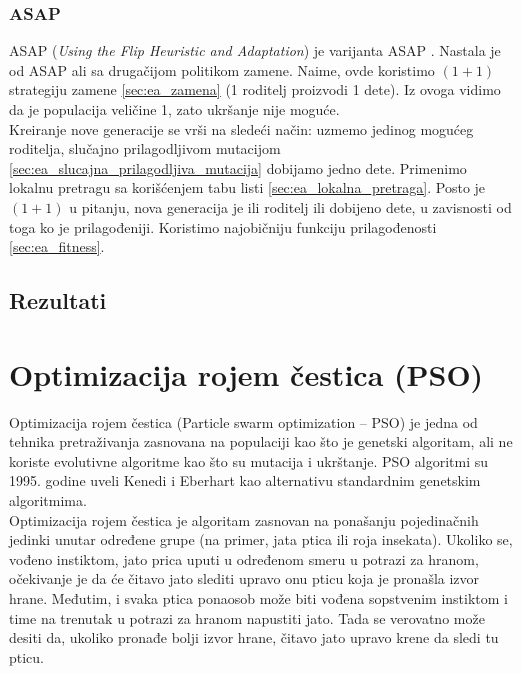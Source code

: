 \documentclass{article}
\begin{document}
\subsubsection{ASAP}
\label{sec:ea_asap}
ASAP (\textit{Using the Flip Heuristic and Adaptation}) je varijanta ASAP \cite{ea_with_table}. Nastala je od ASAP ali sa drugačijom politikom zamene. Naime, ovde koristimo
$(1+1)$ strategiju zamene \ref{sec:ea_zamena} (1 roditelj proizvodi 1 dete). Iz ovoga vidimo da je populacija veličine 1, zato ukršanje nije moguće. \\

Kreiranje nove generacije se vrši na sledeći način: uzmemo jedinog mogućeg roditelja, slučajno prilagodljivom mutacijom \ref{sec:ea_slucajna_prilagodljiva_mutacija} dobijamo jedno dete. Primenimo lokalnu pretragu sa korišćenjem tabu listi \ref{sec:ea_lokalna_pretraga}. Posto je $(1+1)$ u pitanju, nova generacija je ili roditelj ili dobijeno dete, u zavisnosti od toga ko je prilagođeniji. Koristimo najobičniju funkciju prilagođenosti \ref{sec:ea_fitness}.

\subsection{Rezultati}
\label{sec:ea_rezultati}



\section{Optimizacija rojem čestica (PSO)}
\label{sec:pso}

Optimizacija rojem čestica (Particle swarm optimization – PSO) je jedna od tehnika pretraživanja zasnovana na populaciji kao što je genetski algoritam, ali ne koriste evolutivne algoritme kao što su mutacija i ukrštanje.
PSO algoritmi su 1995. godine uveli Kenedi i Eberhart kao alternativu standardnim genetskim algoritmima. \\

Optimizacija rojem čestica je algoritam zasnovan na ponašanju pojedinačnih jedinki unutar određene grupe (na primer, jata ptica ili roja insekata). Ukoliko se, vođeno instiktom, jato prica uputi u određenom smeru u potrazi za hranom, očekivanje je da će čitavo jato slediti upravo onu pticu koja je pronašla izvor hrane. Međutim, i svaka ptica ponaosob može biti vođena sopstvenim instiktom i time na trenutak u potrazi za hranom napustiti jato. Tada se verovatno može desiti da, ukoliko pronađe bolji izvor hrane, čitavo jato upravo krene da sledi tu pticu. \\
\end{document}
